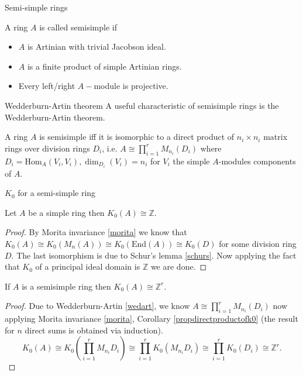 \documentclass{beamer}
\newcommand{\Z}{\mathbb{Z}}
\newcommand{\Hom}{{\mathrm{Hom}}}
\begin{document}
\begin{frame}[allowframebreaks]{Semi-simple rings}
		\begin{definition}
		A ring $A$ is called semisimple if
		\begin{itemize}
			\item $A$ is Artinian with trivial Jacobson ideal. 
			\item $A$ is a finite product of simple Artinian rings.
			\item Every left/right $A-$module is projective.
		\end{itemize}
	\end{definition}
	
\end{frame}
\begin{frame}{Wedderburn-Artin theorem}
	A useful characteristic of semisimple rings is the Wedderburn-Artin theorem.
	
	\begin{theorem}\label{wedart}
		A ring $A$ is semisimple iff it is isomorphic to a direct product of $n_i \times n_i$ matrix rings over division rings $D_i$, i.e. $A \cong \prod_{i=1}^r M_{n_i}(D_i)$ where $D_i =\Hom_A(V_i,V_i), \dim_{D_i}(V_i)=n_i$ for $V_i$ the simple $A$-modules components of $A$.
	\end{theorem}
\end{frame}
\begin{frame}[allowframebreaks]{$K_0$ for a semi-simple ring}
	\begin{lemma}
		Let $A$ be a simple ring then $K_0(A) \cong \Z $.
	\end{lemma}
	\begin{proof}
		By Morita invariance \ref{morita} we know that $K_0(A) \cong K_0(M_n(A)) \cong K_0(\mathrm{End}(A)) \cong K_0(D)$ for some division ring $D$. The last isomorphism is due to Schur's lemma \ref{schurs}. Now applying the fact that $K_0$ of a principal ideal domain is $\Z$ we are done.
	\end{proof}
	\begin{theorem}
		If $A$ is a semisimple ring then $K_0(A)\cong \Z^r$.
	\end{theorem}
	\begin{proof}
		Due to Wedderburn-Artin \ref{wedart}, we know $A \cong \prod_{i=1}^r M_{n_i} (D_i)$ now applying Morita invariance \ref{morita}, Corollary \ref{propdirectproductofk0} (the result for $n$ direct sums is obtained via induction).
		$$K_0(A) \cong K_0\left(\prod_{i=1}^r M_{n_i} D_i\right) \cong \prod_{i=1}^r K_0\left( M_{n_i}D_i\right) \cong \prod_{i=1}^r K_0(D_i) \cong \Z^r.$$
	\end{proof}
\end{frame}
\end{document}
